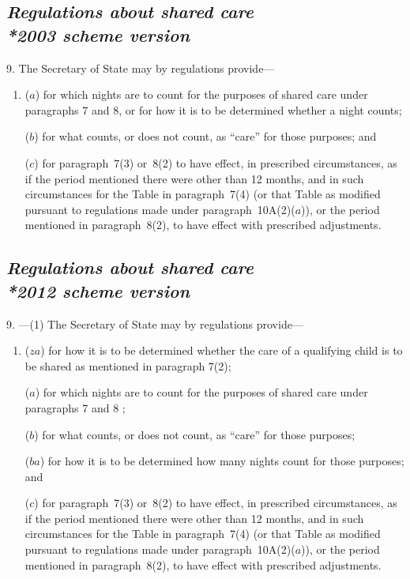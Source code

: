 \documentclass[12pt,a4paper]{article}
\begin{document}

\subsection*{\itshape Regulations about shared care\\*\emph{2003 scheme version}}

9. The Secretary of State may by regulations provide—
\begin{enumerate}\item[]
($a$) for which nights are to count for the purposes of shared care under paragraphs 7 and 8, or for how it is to be determined whether a night counts;

($b$) for what counts, or does not count, as “care” for those purposes; and

($c$) for paragraph~7(3)  or~8(2)  to have effect, in prescribed circumstances, as if the period mentioned there were other than 12 months, and in such circumstances for the Table in paragraph~7(4)  (or that Table as modified pursuant to regulations made under paragraph~10A(2)($a$)), or the period mentioned in paragraph~8(2), to have effect with prescribed adjustments.
\end{enumerate}

\subsection*{\itshape Regulations about shared care\\*\emph{2012 scheme version}}

9.%
---(1)  %
The Secretary of State may by regulations provide—
\begin{enumerate}\item[]
($za$) for how it is to be determined whether the care of a qualifying child is to be shared as mentioned in paragraph 7(2);

($a$) for which nights are to count for the purposes of shared care under paragraphs 7 and 8%
;

($b$) for what counts, or does not count, as “care” for those purposes; 

($ba$) for how it is to be determined how many nights count for those purposes; and

($c$) for paragraph~7(3)  or~8(2)  to have effect, in prescribed circumstances, as if the period mentioned there were other than 12 months, and in such circumstances for the Table in paragraph~7(4)  (or that Table as modified pursuant to regulations made under paragraph~10A(2)($a$)), or the period mentioned in paragraph~8(2), to have effect with prescribed adjustments.
\end{enumerate}
\end{document}
